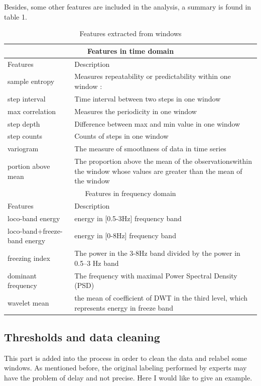 \documentclass[article]{article}
\begin{document}
 Besides, some other features are included in the analysis, a summary is found in table 1.
\begin{center}
	\begin{table}
	\begin{tabular}{ |p{2cm}||p{6cm}|  }
		\hline
		\multicolumn{2}{|c|}{Features in time domain} \\
		\hline
		Features & Description\\
		\hline
		sample entropy & Measures repeatability or predictability within one window : \\
		\hline
		step interval & Time interval between two steps in one window\\
		\hline
		max correlation & Measures the periodicity in one window\\
		\hline
		step depth & Difference between max and min value in one window\\
		\hline
		step counts & Counts of steps in one window \\
		\hline
		variogram & The measure of smoothness of data in time series \\
		\hline
		portion above mean &The proportion above the mean of the observationswithin the window whose values are greater than
		the mean of the window \\
		
		\hline
		\multicolumn{2}{|c|}{Features in frequency domain}
		\\
		\hline
		Features & Description\\
		\hline
		loco-band energy & energy in [0.5-3Hz] frequency band\\
		\hline
		loco-band+freeze-band energy & energy in [0-8Hz] frequency band \\
		\hline
		freezing index & The power in the 3-8Hz band divided by the power in 0.5–3 Hz band  \\
		\hline
		dominant frequency & The frequency with maximal Power Spectral Density (PSD) \\
		\hline
		wavelet mean & the mean of coefficient of DWT in the third level, which represents energy in freeze band \\
		
		\hline
	\end{tabular}
\label{ft1}
\caption{Features extracted from windows}
\end{table}
\end{center}


	
\subsection{Thresholds and data cleaning}
This part is added into the process in order to clean the data and relabel some windows. As mentioned before, the original labeling performed by experts may have the problem of delay and not precise. Here I would like to give an example. 
\end{document}
